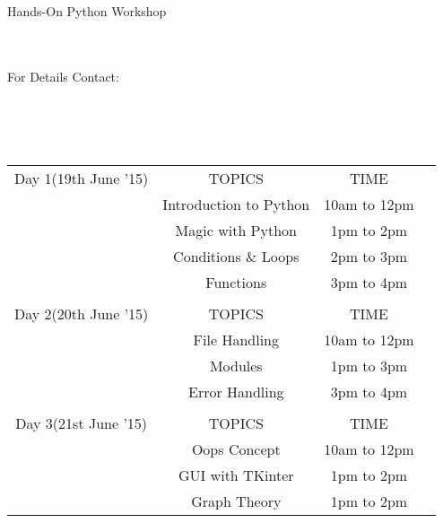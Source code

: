 \documentclass[11pt,a4paper]{article}
\begin{document}
\caption{\huge \hspace{0.6cm} Hands-On Python Workshop} \\
\\
\caption{\hspace{2.3cm} For Details Contact: \\
 \\
}
\\
\\
  \begin{tabular}{cccc}
  

    \rowcolor{gray!50}
  Day 1(19th June '15) & TOPICS & TIME\\
      & Introduction to Python & 10am to 12pm\\
      & Magic with Python & 1pm to 2pm\\
      & Conditions \& Loops & 2pm to 3pm\\
      & Functions & 3pm to 4pm\\
      &  & \\
     \rowcolor{gray!50}
  Day 2(20th June '15) & TOPICS & TIME\\
      & File Handling & 10am to 12pm\\
      & Modules & 1pm to 3pm\\
      & Error Handling & 3pm to 4pm\\
      &  & \\
     \rowcolor{gray!50}
  Day 3(21st June '15) & TOPICS & TIME\\
	  & Oops Concept & 10am to 12pm\\
      & GUI with TKinter & 1pm to 2pm\\	      
      & Graph Theory & 1pm to 2pm\\
          
  \end{tabular}
\end{document}

